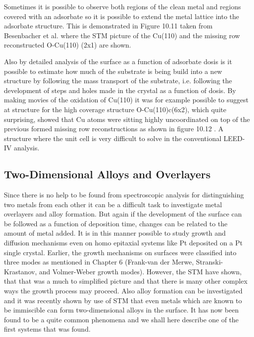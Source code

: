 \vspace{1cm} 



 Sometimes it is possible to observe both regions of the clean metal and regions covered with an adsorbate so it is possible to extend the metal lattice into the adsorbate structure. This is demonstrated in Figure 10.11 taken from Besenbacher et al. \cite{Besenbacher1} where the STM picture of the Cu(110) and the missing row reconstructed O-Cu(110) (2x1) are shown. 

\vspace*{11cm}


\vspace{1cm} 


Also by detailed analysis of the surface as a function of adsorbate dosis is it possible to estimate how much of the substrate is being build into a new structure by following the mass transport of the substrate, i.e. following the  development of steps and holes made in the crystal as a function of dosis. By making movies of the oxidation of Cu(110) it  was  for example possible to suggest at structure for the high coverage structure O-Cu(110)c(6x2), which quite surprising, showed that Cu atoms were sitting highly uncoordinated on top of the previous formed missing row reconstructions as shown in figure 10.12 \cite{Besenbacher1}. A structure where the unit cell is very difficult to solve in the conventional LEED-IV analysis.

\vspace*{11cm}


\vspace{1cm} 

\subsection{ Two-Dimensional Alloys and Overlayers}
Since there is no help to be found from spectroscopic analysis for distinguishing two metals from each other it can be a difficult task to investigate metal overlayers and alloy formation. But again if  the development of the surface can be followed as a function of deposition time, changes can be related to the amount of metal added. It is in this manner possible to study growth and diffusion mechanisms even on homo epitaxial systems like Pt deposited on a Pt single crystal. Earlier, the  growth mechanisms on surfaces were classified into  three modes as  mentioned  in Chapter 6 (Frank-van der Merwe, Stranski-Krastanov, and Volmer-Weber growth modes). However, the STM have shown, that that was a much to simplified picture and that there is many other complex ways the growth process may proceed. Also alloy formation can be investigated and it was recently shown by use of STM that even metals which are known to be immiscible can form two-dimensional alloys in the surface. It has now been found to be a quite common phenomena \cite{Besenbacher2} and we shall here describe  one of the first systems that was found.

